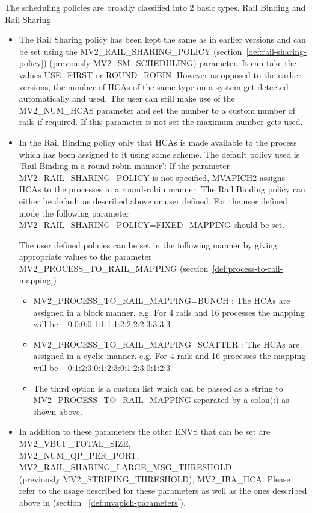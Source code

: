 The scheduling policies are broadly classified into 2 basic types.
Rail Binding and Rail Sharing.

\begin{itemize}
    \item The Rail Sharing policy has been kept the same as in earlier
          versions and can be set using the MV2\_RAIL\_SHARING\_POLICY
          (section~\ref{def:rail-sharing-policy})
          (previously MV2\_SM\_SCHEDULING) parameter. It can take the
          values USE\_FIRST or ROUND\_ROBIN. However as opposed to the
          earlier versions, the number of HCAs of the same type on a
          system get detected automatically and used. The user can still
          make use of the MV2\_NUM\_HCAS parameter and set the number to
          a custom number of rails if required. If this parameter is not
          set the maximum number gets used.
    \item In the Rail Binding policy only that HCAs is made available to
          the process which has been assigned to it using some scheme. The
          default policy used is 'Rail Binding in a round-robin manner': If
          the parameter MV2\_RAIL\_SHARING\_POLICY is not specified, MVAPICH2
          assigns HCAs to the processes in a round-robin manner. The Rail
          Binding policy can either be default as described above or user defined.
          For the user defined mode the following parameter
          MV2\_RAIL\_SHARING\_POLICY=FIXED\_MAPPING should be set.

          The user defined policies can be set in the following manner by giving
          appropriate values to the parameter MV2\_PROCESS\_TO\_RAIL\_MAPPING
          (section~\ref{def:process-to-rail-mapping})

          \begin{itemize}
              \item MV2\_PROCESS\_TO\_RAIL\_MAPPING=BUNCH : The HCAs are assigned in a
                    block manner. e.g. For 4 rails and 16 processes the mapping
                    will be – 0:0:0:0:1:1:1:1:2:2:2:2:3:3:3:3
              \item MV2\_PROCESS\_TO\_RAIL\_MAPPING=SCATTER : The HCAs are assigned
                    in a cyclic manner. e.g. For 4 rails and 16 processes the mapping
                    will be – 0:1:2:3:0:1:2:3:0:1:2:3:0:1:2:3
              \item The third option is a custom list which can be passed as a string
                    to \\ MV2\_PROCESS\_TO\_RAIL\_MAPPING separated by a colon(:) as shown above.
          \end{itemize}
    \item In addition to these parameters the other ENVS that can be set are
          MV2\_VBUF\_TOTAL\_SIZE, \\ MV2\_NUM\_QP\_PER\_PORT,
          MV2\_RAIL\_SHARING\_LARGE\_MSG\_THRESHOLD \\ (previously MV2\_STRIPING\_THRESHOLD),
          MV2\_IBA\_HCA. Please refer to the usage described for these parameters as well as
          the ones described above in (section~	\ref{def:mvapich-parameters}).
\end{itemize}

